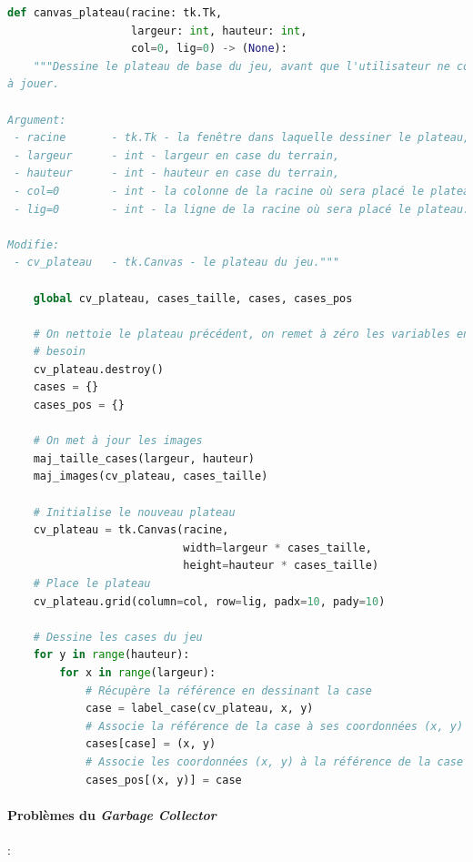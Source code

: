 \documentclass[12pt, a4paper]{article}
\begin{document}
\newpage

\begin{lstlisting}[language=Python, caption=Fonction \emph{canvas\_plateau}]
def canvas_plateau(racine: tk.Tk,
                   largeur: int, hauteur: int,
                   col=0, lig=0) -> (None):
    """Dessine le plateau de base du jeu, avant que l'utilisateur ne commence \
à jouer.

Argument:
 - racine       - tk.Tk - la fenêtre dans laquelle dessiner le plateau,
 - largeur      - int - largeur en case du terrain,
 - hauteur      - int - hauteur en case du terrain,
 - col=0        - int - la colonne de la racine où sera placé le plateau,
 - lig=0        - int - la ligne de la racine où sera placé le plateau.

Modifie:
 - cv_plateau   - tk.Canvas - le plateau du jeu."""

    global cv_plateau, cases_taille, cases, cases_pos

    # On nettoie le plateau précédent, on remet à zéro les variables en ayant
    # besoin
    cv_plateau.destroy()
    cases = {}
    cases_pos = {}

    # On met à jour les images
    maj_taille_cases(largeur, hauteur)
    maj_images(cv_plateau, cases_taille)

    # Initialise le nouveau plateau
    cv_plateau = tk.Canvas(racine,
                           width=largeur * cases_taille,
                           height=hauteur * cases_taille)
    # Place le plateau
    cv_plateau.grid(column=col, row=lig, padx=10, pady=10)

    # Dessine les cases du jeu
    for y in range(hauteur):
        for x in range(largeur):
            # Récupère la référence en dessinant la case
            case = label_case(cv_plateau, x, y)
            # Associe la référence de la case à ses coordonnées (x, y)
            cases[case] = (x, y)
            # Associe les coordonnées (x, y) à la référence de la case
            cases_pos[(x, y)] = case
\end{lstlisting}

\newpage

\paragraph{Problèmes du \emph{Garbage Collector}}:
\end{document}
